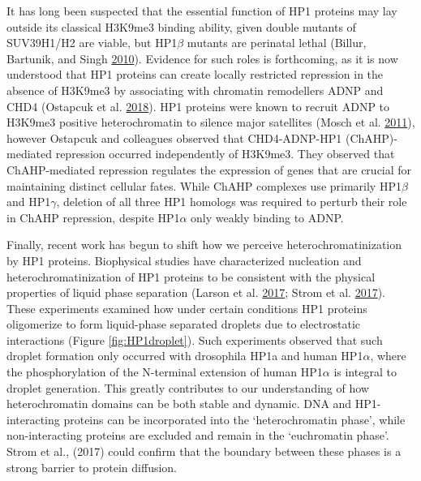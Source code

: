 \documentclass[onehalf,12pt]{beavtex}
\begin{document}
  It has long been suspected that the essential function of HP1 proteins
  may lay outside its classical H3K9me3 binding ability, given double
  mutants of SUV39H1/H2 are viable, but HP1\(\beta\) mutants are perinatal
  lethal (Billur, Bartunik, and Singh
  \protect\hyperlink{ref-BilluressentialfunctionHP1v2010}{2010}). Evidence
  for such roles is forthcoming, as it is now understood that HP1 proteins
  can create locally restricted repression in the absence of H3K9me3 by
  associating with chromatin remodellers ADNP and CHD4 (Ostapcuk et al.
  \protect\hyperlink{ref-OstapcukActivitydependentneuroprotectiveprotein2018}{2018}).
  HP1 proteins were known to recruit ADNP to H3K9me3 positive
  heterochromatin to silence major satellites (Mosch et al.
  \protect\hyperlink{ref-MoschHP1RecruitsActivityDependent2011}{2011}),
  however Ostapcuk and colleagues observed that CHD4-ADNP-HP1
  (ChAHP)-mediated repression occurred independently of H3K9me3. They
  observed that ChAHP-mediated repression regulates the expression of
  genes that are crucial for maintaining distinct cellular fates. While
  ChAHP complexes use primarily HP1\(\beta\) and HP1\(\gamma\), deletion
  of all three HP1 homologs was required to perturb their role in ChAHP
  repression, despite HP1\(\alpha\) only weakly binding to ADNP.
  
  Finally, recent work has begun to shift how we perceive
  heterochromatinization by HP1 proteins. Biophysical studies have
  characterized nucleation and heterochromatinization of HP1 proteins to
  be consistent with the physical properties of liquid phase separation
  (Larson et al.
  \protect\hyperlink{ref-LarsonLiquiddropletformation2017}{2017}; Strom et
  al. \protect\hyperlink{ref-StromPhaseseparationdrives2017}{2017}). These
  experiments examined how under certain conditions HP1 proteins
  oligomerize to form liquid-phase separated droplets due to electrostatic
  interactions (Figure \ref{fig:HP1droplet}). Such experiments observed
  that such droplet formation only occurred with drosophila HP1a and human
  HP1\(\alpha\), where the phosphorylation of the N-terminal extension of
  human HP1\(\alpha\) is integral to droplet generation. This greatly
  contributes to our understanding of how heterochromatin domains can be
  both stable and dynamic. DNA and HP1-interacting proteins can be
  incorporated into the `heterochromatin phase', while non-interacting
  proteins are excluded and remain in the `euchromatin phase'. Strom et
  al., (2017) could confirm that the boundary between these phases is a
  strong barrier to protein diffusion.
  
\end{document}

